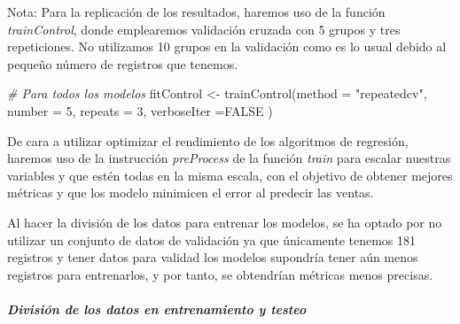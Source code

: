\documentclass[
]{article}
\author{}
\date{\vspace{-2.5em}}
\newenvironment{Shaded}{\begin{snugshade}}{\end{snugshade}}
\newcommand{\AttributeTok}[1]{\textcolor[rgb]{0.77,0.63,0.00}{#1}}
\newcommand{\CommentTok}[1]{\textcolor[rgb]{0.56,0.35,0.01}{\textit{#1}}}
\newcommand{\ConstantTok}[1]{\textcolor[rgb]{0.00,0.00,0.00}{#1}}
\newcommand{\DecValTok}[1]{\textcolor[rgb]{0.00,0.00,0.81}{#1}}
\newcommand{\FunctionTok}[1]{\textcolor[rgb]{0.00,0.00,0.00}{#1}}
\newcommand{\NormalTok}[1]{#1}
\newcommand{\OtherTok}[1]{\textcolor[rgb]{0.56,0.35,0.01}{#1}}
\newcommand{\StringTok}[1]{\textcolor[rgb]{0.31,0.60,0.02}{#1}}
\begin{document}
\ifdefined\ifprincipal
\else
\setlength{\parindent}{1em}
\pagestyle{fancy}
\setcounter{tocdepth}{4}
\tableofcontents

\fi

\ifdefined\ifdoblecara
\fancyhead{}{}
\fancyhead[LE,RO]{\scriptsize\rightmark}
\fancyfoot[LO,RE]{\scriptsize\slshape \leftmark}
\fancyfoot[C]{}
\fancyfoot[LE,RO]{\footnotesize\thepage}
\else
\fancyhead{}{}
\fancyhead[RO]{\scriptsize\rightmark}
\fancyfoot[LO]{\scriptsize\slshape \leftmark}
\fancyfoot[C]{}
\fancyfoot[RO]{\footnotesize\thepage}
\fi
\renewcommand{\headrulewidth}{0.4pt}
\renewcommand{\footrulewidth}{0.4pt}

Nota: Para la replicación de los resultados, haremos uso de la función
\emph{trainControl}, donde emplearemos validación cruzada con 5 grupos y
tres repeticiones. No utilizamos 10 grupos en la validación como es lo
usual debido al pequeño número de registros que tenemos.

\begin{Shaded}
\begin{Highlighting}[]
\CommentTok{\# Para todos los modelos}
\NormalTok{fitControl }\OtherTok{\textless{}{-}} \FunctionTok{trainControl}\NormalTok{(}\AttributeTok{method =} \StringTok{"repeatedcv"}\NormalTok{,}
                           \AttributeTok{number =} \DecValTok{5}\NormalTok{, }\AttributeTok{repeats =} \DecValTok{3}\NormalTok{,}
                           \AttributeTok{verboseIter =}\ConstantTok{FALSE}\NormalTok{ )}
\end{Highlighting}
\end{Shaded}

De cara a utilizar optimizar el rendimiento de los algoritmos de
regresión, haremos uso de la instrucción \emph{preProcess} de la función
\emph{train} para escalar nuestras variables y que estén todas en la
misma escala, con el objetivo de obtener mejores métricas y que los
modelo minimicen el error al predecir las ventas.

Al hacer la división de los datos para entrenar los modelos, se ha
optado por no utilizar un conjunto de datos de validación ya que
únicamente tenemos 181 registros y tener datos para validad los modelos
supondría tener aún menos registros para entrenarlos, y por tanto, se
obtendrían métricas menos precisas.

\hypertarget{divisiuxf3n-de-los-datos-en-entrenamiento-y-testeo}{%
\subparagraph{División de los datos en entrenamiento y
testeo}\label{divisiuxf3n-de-los-datos-en-entrenamiento-y-testeo}}
\end{document}
